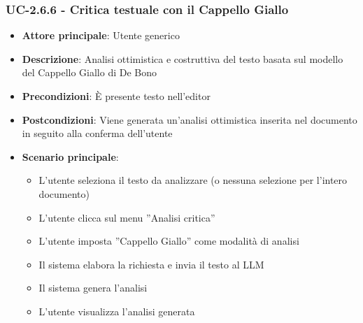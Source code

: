\documentclass[11pt,a4paper]{article}
\begin{document}
\subsubsection{UC-2.6.6 - Critica testuale con il Cappello Giallo}
\begin{itemize}
    \item \textbf{Attore principale}: Utente generico
    \item \textbf{Descrizione}: Analisi ottimistica e costruttiva del testo basata sul modello del Cappello Giallo di De Bono
    \item \textbf{Precondizioni}: È presente testo nell’editor
    \item \textbf{Postcondizioni}: Viene generata un’analisi ottimistica inserita nel documento in seguito alla conferma dell'utente
    \item \textbf{Scenario principale}:
    \begin{itemize}
        \item L’utente seleziona il testo da analizzare (o nessuna selezione per l'intero documento)
        \item L’utente clicca sul menu ”Analisi critica”
        \item L’utente imposta ”Cappello Giallo” come modalità di analisi
        \item Il sistema elabora la richiesta e invia il testo al LLM
        \item Il sistema genera l'analisi 
        \item L'utente visualizza l'analisi generata
    \end{itemize}
\end{itemize}
\end{document}
